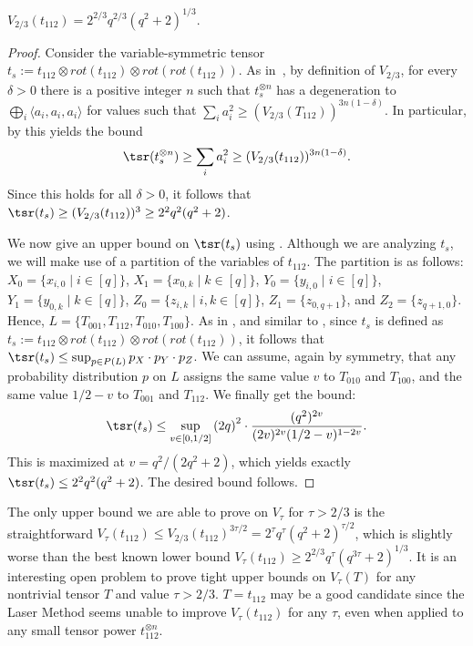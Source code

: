 \documentclass{toc}
\begin{document}
\begin{proposition} \label{valueprop}
$V_{2/3}(t_{112}) = 2^{2/3} q^{2/3} (q^{2} + 2)^{1/3}.$
\end{proposition}

\begin{proof}
Consider the variable-symmetric tensor $t_s := t_{112} \otimes rot(t_{112}) \otimes rot(rot(t_{112}))$.
As in~\cite{coppersmith}, by definition of $V_{2/3}$, for every $\delta>0$ there is a positive integer $n$ such that $t_s^{\otimes n}$ has a degeneration to $\bigoplus_i \langle a_i, a_i, a_i \rangle$ for values such that $\sum_i a_i^2 \geq (V_{2/3}(T_{112}))^{3n(1-\delta)}$. In particular, by  this yields the bound $$\tsr(t_s^{\otimes n}) \geq \sum_i a_i^2 \geq (V_{2/3}(t_{112}))^{3n(1-\delta)}.$$ Since this holds for all $\delta>0$, it follows that $\tsr(t_s)  \geq (V_{2/3}(t_{112}))^3 \geq 2^{2} q^{2} (q^{2} + 2)$.

We now %
give an upper bound on %
$\tsr(t_s)$ using . Although we are analyzing $t_s$, we will make use of a partition of the variables of $t_{112}$. The partition is as follows: $X_0 = \{ x_{i,0} \mid i \in [q] \}$, $X_1 = \{ x_{0,k} \mid k \in [q] \}$, $Y_0 = \{ y_{i,0} \mid i \in [q] \}$, $Y_1 = \{ y_{0,k} \mid k \in [q] \}$, $Z_0 = \{ z_{i,k} \mid i,k \in [q] \}$, $Z_1 = \{ z_{0,q+1} \}$, and $Z_2 = \{ z_{q+1,0} \}$. Hence, $L = \{ T_{001}, T_{112}, T_{010}, T_{100} \}$. As in \cite{coppersmith}, and similar to , since $t_s$ is defined as $t_s := t_{112} \otimes rot(t_{112}) \otimes rot(rot(t_{112}))$, it follows that $\tsr(t_s) \leq \sup_{p \in P(L)} p_X \cdot p_Y \cdot p_Z$.
We can assume, again by symmetry, that any probability distribution $p$ on $L$ assigns the same value $v$ to $T_{010}$ and $T_{100}$, and the same value $1/2 - v$ to $T_{001}$ and $T_{112}$. We finally get the bound:
\[
  \tsr(t_s) \leq \sup_{v \in [0,1/2]} \left( 2q \right)^2 \cdot \frac{(q^2)^{2v}}{(2v)^{2v} (1/2-v)^{1-2v}}.
\]
This is maximized at $v = q^2 / (2q^2+2)$, which yields exactly $\tsr(t_s) \leq 2^{2} q^{2} (q^{2} + 2)$. The desired bound follows.
\end{proof}

The only upper bound we are able to prove on $V_{\tau}$ for $\tau>2/3$ is the straightforward $V_\tau(t_{112}) \leq V_{2/3}(t_{112})^{3 \tau/2} = 2^{\tau} q^{\tau} (q^{2} + 2)^{\tau/2}$, which is slightly worse than the best known lower bound $V_\tau(t_{112}) \geq 2^{2/3} q^\tau (q^{3\tau} + 2)^{1/3}$. It is an interesting open problem to prove tight upper bounds on $V_\tau(T)$ for any nontrivial tensor $T$ and value $\tau>2/3$. $T = t_{112}$ may be a good candidate since the Laser Method seems unable to improve $V_\tau(t_{112})$ for any $\tau$, even when applied to any small tensor power $t_{112}^{\otimes n}$.
\end{document}
